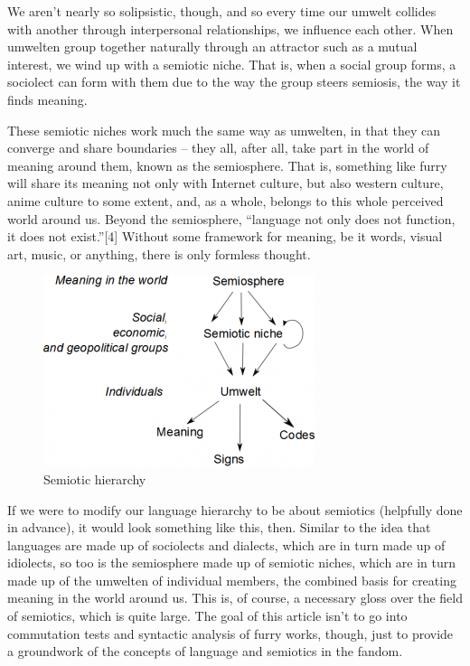 We aren't nearly so solipsistic, though, and so every time our umwelt collides with another through interpersonal relationships, we influence each other. When umwelten group together naturally through an attractor such as a mutual interest, we wind up with a semiotic niche. That is, when a social group forms, a sociolect can form with them due to the way the group steers semiosis, the way it finds meaning.

These semiotic niches work much the same way as umwelten, in that they can converge and share boundaries -- they all, after all, take part in the world of meaning around them, known as the semiosphere. That is, something like furry will share its meaning not only with Internet culture, but also western culture, anime culture to some extent, and, as a whole, belongs to this whole perceived world around us. Beyond the semiosphere, ``language not only does not function, it does not exist.''[4] Without some framework for meaning, be it words, visual art, music, or anything, there is only formless thought.

\begin{figure}
  \begin{center}
    \includegraphics{content/assets/meaning--semiotic-hierarchy}
  \end{center}
  \caption{Semiotic hierarchy}
\end{figure}

If we were to modify our language hierarchy to be about semiotics (helpfully done in advance), it would look something like this, then. Similar to the idea that languages are made up of sociolects and dialects, which are in turn made up of idiolects, so too is the semiosphere made up of semiotic niches, which are in turn made up of the umwelten of individual members, the combined basis for creating meaning in the world around us. This is, of course, a necessary gloss over the field of semiotics, which is quite large. The goal of this article isn't to go into commutation tests and syntactic analysis of furry works, though, just to provide a groundwork of the concepts of language and semiotics in the fandom.


